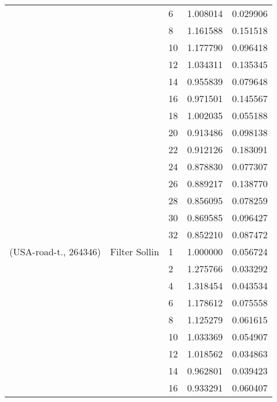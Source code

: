 \begin{tabular}{lllrr}
                      &                     & 6  &  1.008014 &  0.029906 \\
                      &                     & 8  &  1.161588 &  0.151518 \\
                      &                     & 10 &  1.177790 &  0.096418 \\
                      &                     & 12 &  1.034311 &  0.135345 \\
                      &                     & 14 &  0.955839 &  0.079648 \\
                      &                     & 16 &  0.971501 &  0.145567 \\
                      &                     & 18 &  1.002035 &  0.055188 \\
                      &                     & 20 &  0.913486 &  0.098138 \\
                      &                     & 22 &  0.912126 &  0.183091 \\
                      &                     & 24 &  0.878830 &  0.077307 \\
                      &                     & 26 &  0.889217 &  0.138770 \\
                      &                     & 28 &  0.856095 &  0.078259 \\
                      &                     & 30 &  0.869585 &  0.096427 \\
                      &                     & 32 &  0.852210 &  0.087472 \\
(USA-road-t., 264346) & Filter Sollin & 1  &  1.000000 &  0.056724 \\
                      &                     & 2  &  1.275766 &  0.033292 \\
                      &                     & 4  &  1.318454 &  0.043534 \\
                      &                     & 6  &  1.178612 &  0.075558 \\
                      &                     & 8  &  1.125279 &  0.061615 \\
                      &                     & 10 &  1.033369 &  0.054907 \\
                      &                     & 12 &  1.018562 &  0.034863 \\
                      &                     & 14 &  0.962801 &  0.039423 \\
                      &                     & 16 &  0.933291 &  0.060407 \\

\end{tabular}
